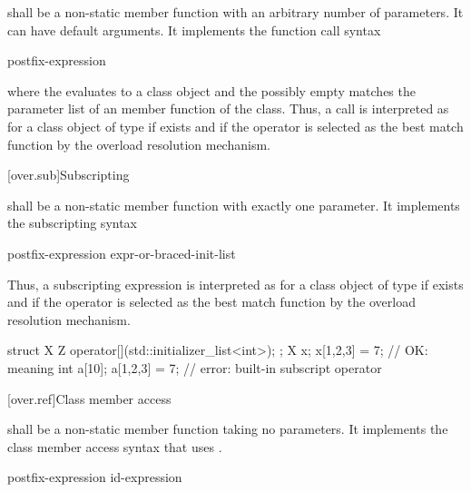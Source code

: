 \pnum
{}
shall be a non-static member function with an arbitrary number of
parameters.
It can have default arguments.
It implements the function call syntax
\begin{ncsimplebnf}
postfix-expression \terminal{(}  \terminal{)}
\end{ncsimplebnf}
where the
evaluates to a class object and the possibly empty
matches the parameter list of an
member function of the class.
Thus, a call
is interpreted as
for a class object
of type
if
exists and if the operator is selected as the best match function by
the overload resolution mechanism.

[over.sub]{Subscripting}%
%

\pnum
{}
shall be a non-static member function with exactly one parameter.
It implements the subscripting syntax
\begin{ncsimplebnf}
postfix-expression \terminal{[} expr-or-braced-init-list \terminal{]}
\end{ncsimplebnf}

Thus, a subscripting expression
is interpreted as
for a class object
of type
if
exists and if the operator is selected as the best match function by
the overload resolution mechanism.
\begin{example}
\begin{codeblock}
struct X {
  Z operator[](std::initializer_list<int>);
};
X x;
x[{1,2,3}] = 7;                 // OK: meaning 
int a[10];
a[{1,2,3}] = 7;                 // error: built-in subscript operator
\end{codeblock}
\end{example}

[over.ref]{Class member access}
%

\pnum
{}
shall be a non-static member function taking no parameters.
It implements the class member access syntax that
uses \tcode{->}.

\begin{ncsimplebnf}
postfix-expression \terminal{->}  id-expression
\end{ncsimplebnf}

